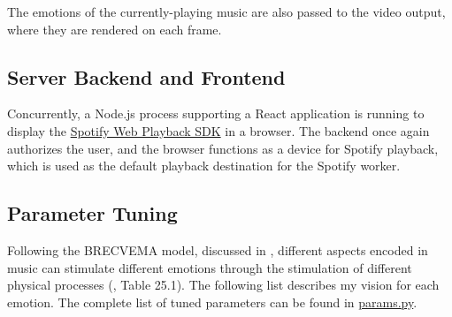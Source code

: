 \documentclass{article}
\renewcommand{\_}[1]{\underline{ #1 }}
\theoremstyle{definition}
\begin{document}
The emotions of the currently-playing music are also passed to the video output, where they are rendered on each frame.

\subsection[Server Backend and Frontend]{Server Backend and Frontend}

Concurrently, a Node.js process supporting a React application is running to display the \href{https://developer.spotify.com/documentation/web-playback-sdk/}{Spotify Web Playback SDK} in a browser. The backend once again authorizes the user, and the browser functions as a device for Spotify playback, which is used as the default playback destination for the Spotify worker. 

\subsection[Parameter Tuning]{Parameter Tuning}

Following the BRECVEMA model, discussed in \cite{17juslin2019}, different aspects encoded in music can stimulate different emotions through the stimulation of different physical processes (\cite{25juslin2019}, Table 25.1). The following list describes my vision for each emotion. The complete list of tuned parameters can be found in \href{https://github.com/as4mo3/face-the-music/blob/master/params.py}{params.py}. 
\end{document}
